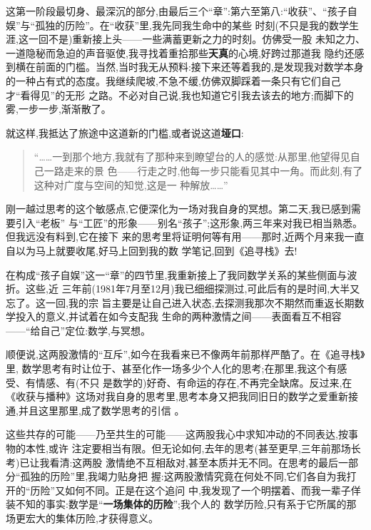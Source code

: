 这第一阶段最切身、最深沉的部分,由最后三个“章”:第六至第八:“收获”、“孩子自娱”与“孤独的历险”。在“收获”里,我先同我生命中的某些
时刻(不只是我的数学生涯,这一回不是)重新接上头——一些满蓄更新之力的时刻。仿佛受一股
未知之力、一道隐秘而急迫的声音驱使,我寻找着重拾那些\textbf{天真}的心境\dmark{},好跨过那道我
隐约还感到横在前面的门槛。当然,当时我无从预料:接下来还等着我的,是发现我对数学本身
的一种占有式的态度。我继续爬坡,不急不缓,仿佛双脚踩着一条只有它们自己才“看得见”的无形
之路。不必对自己说,我也知道它引我去该去的地方;而脚下的雾,一步一步,渐渐散了。

就这样,我抵达了旅途中这道新的门槛,或者说这道\textbf{垭口}:

\begin{quote}
“……一到那个地方,我就有了那种来到瞭望台的人的感觉:从那里,他望得见自己一路走来的景
色——行走之时,他每一步只能看见其中一角。而此刻,有了这种对广度与空间的知觉,这是一
种解放……”
\end{quote}

刚一越过思考的这个敏感点,它便深化为一场对我自身的冥想。第二天,我已感到需要引入“老板”
与“工匠”的形象——别名“孩子”;这形象,两三年来对我已相当熟悉。但我远没有料到,它在接下
来的思考里将证明何等有用——那时,近两个月来我一直自以为马上就要收尾,好马上回到我的数
学笔记,回到《追寻栈》去!

在构成“孩子自娱”这一“章”的四节里,我重新接上了我同数学关系的某些侧面与波折。这些,近
三年前(1981年7月至12月)我已细细探测过,可此后有的是时间,大半又忘了。这一回,我的宗
旨主要是让自己进入状态,去探测我那次不期然而重返长期数学投入的意义,并试着在如今支配我
生命的两种激情之间——表面看互不相容——“给自己”定位:数学,与冥想。

顺便说,这两股激情的“互斥”,如今在我看来已不像两年前那样严酷了。在《追寻栈》里,
数学思考有时让位于、甚至化作一场多少个人化的思考;在那里,我这个有感受、有情感、有(不只
是数学的)好奇、有命运的存在,不再完全缺席。反过来,在\dmark{}《收获与播种》这场对我自身的思考里,思考本身又把我同旧日的数学之爱重新接通,并且这里那里,成了数学思考的引信
。

这些共存的可能——乃至共生的可能——这两股我心中求知冲动的不同表达,按事物的本性,或许
注定要相当有限。但无论如何,去年的思考(甚至更早,三年前那场长考)已让我看清:这两股
激情绝不互相敌对,甚至本质并无不同。在思考的最后一部分“孤独的历险”里,我竭力贴身把
握:这两股激情究竟在何处不同,它们各自为我打开的“历险”又如何不同。正是在这个追问
中,我发现了一个明摆着、而我一辈子佯装不知的事实:数学是“\textbf{一场集体的历险}”;我个人的
数学历险,只有系于它所属的那场更宏大的集体历险,才获得意义。

